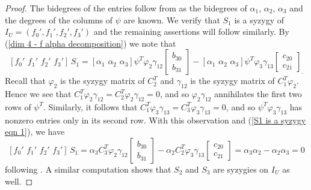 \documentclass[reqno]{amsart}
\numberwithin{equation}{section}
\theoremstyle{definition}
\begin{document}
\begin{proof}
The bidegrees of the entries follow from  as the bidegrees of $\alpha_1$, $\alpha_2$, $\alpha_3$ and the degrees of the columns of $\psi$ are known. We verify that $S_1$ is a syzygy of $I_U= (f_0',f_1',f_2',f_3')$ and the remaining assertions will follow similarly. By (\ref{dim 4 - f alpha decomposition}) we note that
    \begin{equation}\label{S1 is a syzygy eqn 1}
        [f_0'\,\,f_1'\,\,f_2'\,\,f_3']\, S_1 =[\alpha_1\,\,\alpha_2\,\,\alpha_3]\psi^T \varphi_2\gamma_{12}\begin{bmatrix}
                 b_{30}\\
                 b_{31}
             \end{bmatrix}
             -[\alpha_1\,\,\alpha_2\,\,\alpha_3]\psi^T \varphi_3\gamma_{13}\begin{bmatrix}
                 c_{20}\\
                 c_{21}
             \end{bmatrix}_.  
             \end{equation}             
Recall that $\varphi_2$ is the syzygy matrix of $C_2^T$ and $\gamma_{12}$ is the syzygy matrix of $C_1^T\varphi_2$. Hence we see that $C_1^T\varphi_2\gamma_{12} = C_2^T\varphi_2\gamma_{12}=0$, and so $\varphi_2\gamma_{12}$ annihilates the first two rows of $\psi^T$. Similarly, it follows that $C_1^T\varphi_3\gamma_{13} = C_3^T\varphi_3\gamma_{13} =0$, and so $\psi^T\varphi_3\gamma_{13}$ has nonzero entries only in its second row. With this observation and (\ref{S1 is a syzygy eqn 1}), we have 
\[
[f_0'\,\,f_1'\,\,f_2'\,\,f_3']\, S_1=\alpha_3 C_3^T \varphi_2\gamma_{12}\begin{bmatrix}
                 b_{30}\\
                 b_{31}
             \end{bmatrix}
             -\alpha_2C_2^T \varphi_3\gamma_{13}\begin{bmatrix}
                 c_{20}\\
                 c_{21}
             \end{bmatrix} = \alpha_3\alpha_2 - \alpha_2\alpha_3 =0
\]
following . A similar computation shows that $S_2$ and $S_3$ are syzygies on $I_U$ as well.
\end{proof}
\end{document}

